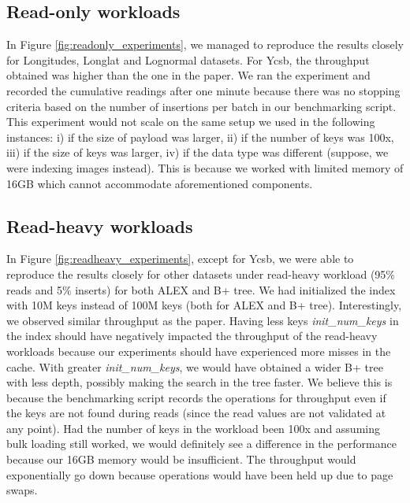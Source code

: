 \documentclass[12pt,a4paper]{article}
\begin{document}
\subsection{Read-only workloads}
In Figure \ref{fig:readonly_experiments}, we managed to reproduce the results closely for Longitudes, Longlat and Lognormal datasets. For Ycsb, the throughput obtained was higher than the one in the paper. We ran the experiment and recorded the cumulative readings after one minute because there was no stopping criteria based on the number of insertions per batch in our benchmarking script. This experiment would not scale on the same setup we used in the following instances: i) if the size of payload was larger, ii) if the number of keys was 100x, iii) if the size of keys was larger, iv) if the data type was different (suppose, we were indexing images instead). This is because we worked with limited memory of 16GB which cannot accommodate aforementioned components.

\subsection{Read-heavy workloads}
In Figure \ref{fig:readheavy_experiments}, except for Ycsb, we were able to reproduce the results closely for other datasets under read-heavy workload (95\% reads and 5\% inserts) for both ALEX and B+ tree. We had initialized the index with 10M keys instead of 100M keys (both for ALEX and B+ tree). Interestingly, we observed similar throughput as the paper. Having less keys \emph{init\_num\_keys} in the index should have negatively impacted the throughput of the read-heavy workloads because our experiments should have experienced more misses in the cache. With greater \emph{init\_num\_keys}, we would have obtained a wider B+ tree with less depth, possibly making the search in the tree faster. We believe this is because the benchmarking script records the operations for throughput even if the keys are not found during reads (since the read values are not validated at any point). Had the number of keys in the workload been 100x and assuming bulk loading still worked, we would definitely see a difference in the performance because our 16GB memory would be insufficient. The throughput would exponentially go down because operations would have been held up due to page swaps.
\end{document}
